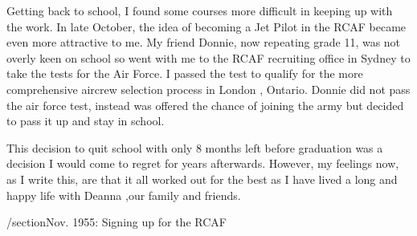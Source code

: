 Getting back to school, I found some courses more difficult in keeping up with the work. In late October, the idea of becoming a Jet Pilot in the RCAF became even more attractive to me. My friend Donnie, now repeating grade 11, was not overly keen on school so went with me to the RCAF recruiting office in Sydney to take the tests for the Air Force. I passed the test to qualify for the more comprehensive aircrew selection process in London , Ontario. Donnie did not pass the air force test, instead was offered the chance of joining the army but decided to pass it up and stay in school.

This decision to quit school with only 8 months left before graduation was a decision I would come to regret for years afterwards. However, my feelings now, as I write this, are that it all worked out for the best as I have lived a long and happy life with Deanna ,our family and friends. 

/section{Nov. 1955: Signing up for the RCAF}


